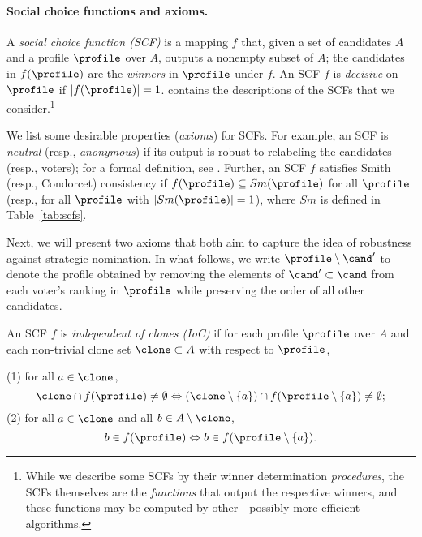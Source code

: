 \paragraph{Social choice functions and axioms.}\label{subsec:axioms}
A \textit{social choice function (SCF)} is a mapping $f$ that, given a set of candidates $A$ and a profile $\profile$ over $A$,
outputs a nonempty subset of $A$; the candidates in $f(\profile)$ are the {\em winners} in $\profile$ under $f$. An SCF $f$ is {\em decisive} on $\profile$ if $|f(\profile)|=1$.  contains the descriptions of the SCFs that we consider.\footnote{While we describe some SCFs by their winner determination \textit{procedures}, the SCFs themselves are the \textit{functions} that  output the respective winners, and these functions may be computed by other---possibly more efficient---algorithms.} 

We list some desirable properties (\emph{axioms}) for SCFs. For example, an SCF is \emph{neutral} (resp., \emph{anonymous}) if its output is robust to relabeling the candidates (resp., voters); for a formal definition, see {\citet[Def. 2.4, 2.5]{Brandt16:Handbook}}. Further, an SCF $f$ satisfies Smith (resp., Condorcet) consistency if $f(\profile) \subseteq Sm(\profile)$ for all $\profile$ (resp., for all $\profile$ with $|Sm(\profile)|=1$), where $Sm$ is defined in Table~\ref{tab:scfs}.

Next, we will present two axioms that both aim to capture the idea of robustness against strategic nomination. In what follows, we write $\profile \setminus \cand'$ to denote the profile obtained by removing the elements of $\cand' \subset \cand$ from each voter's ranking in $\profile$ while preserving the order of all other candidates.

\begin{definition}\label{def:ioc}
An SCF $f$ is \emph{independent of clones (IoC)} if for each profile $\profile$ over $A$ and each non-trivial clone set $\clone \subset A$ with respect to $\profile$,

(1) for all $a \in \clone$, 
\[
    \clone \cap f(\profile) \neq \emptyset \Leftrightarrow \left(\clone \setminus \{a\}\right) \cap f(\profile \setminus \{a\}) \neq \emptyset;  
\]
\indent (2) for all $a \in \clone$ and all $b \in A \setminus \clone$,
\[
    b \in f(\profile) \Leftrightarrow b \in f(\profile \setminus \{a\}).
\]
\end{definition}

